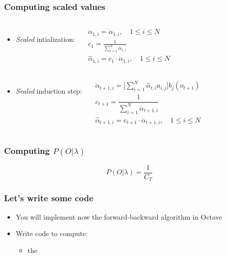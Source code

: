 \begin{frame}
  \frametitle{Computing scaled values}
  \begin{columns}
    \begin{itemize}
    \item \emph{Scaled} intialization:
    \end{itemize}

    \begin{align}[r]
      \ddot{\alpha}_{1,i} = \alpha_{1,i},\quad 1 \le i \le N \\
      c_1 = \frac{1}{\displaystyle\sum_{i=1}^{N} \ddot{\alpha}_{1,i}} \\
      \hat{\alpha}_{1,i} = c_1 \cdot \ddot{\alpha}_{1,i}, \quad 1 \le
      i \le N
    \end{align}
  \end{columns}
  \vspace{.5em}
  \pause
  \begin{columns}
    \begin{itemize}
    \item \emph{Scaled} induction step:
    \end{itemize}

    \begin{align}[r]
      \ddot{\alpha}_{t+1,i} = \Big[
      \displaystyle\sum_{i=1}^{N}\hat{\alpha}_{t,i}a_{i,j}\Big]
      b_{j}(o_{t+1}) \\
      c_{t+1} = \dfrac{1}{\displaystyle\sum_{i=1}^{N} \ddot{\alpha}_{t+1,i}} \\
      \hat{\alpha}_{t+1,i} = c_{t+1} \cdot \ddot{\alpha}_{t+1,i},
      \quad 1 \le i \le N
    \end{align}

  \end{columns}

\end{frame}

\begin{frame}
  \frametitle{Computing $P(O | \lambda)$}
  \begin{equation}
    \label{eq:scaled-probability}
    P(O \vert \lambda) = \frac{1}{C_T}
  \end{equation}
\end{frame}


\begin{frame}
  \frametitle{Let's write some code}
  \begin{itemize}
  \item You will implement now the forward-backward algorithm in
    Octave
  \item Write code to compute:
    \begin{itemize}
    \item the
    \end{itemize}

  \end{itemize}
\end{frame}
